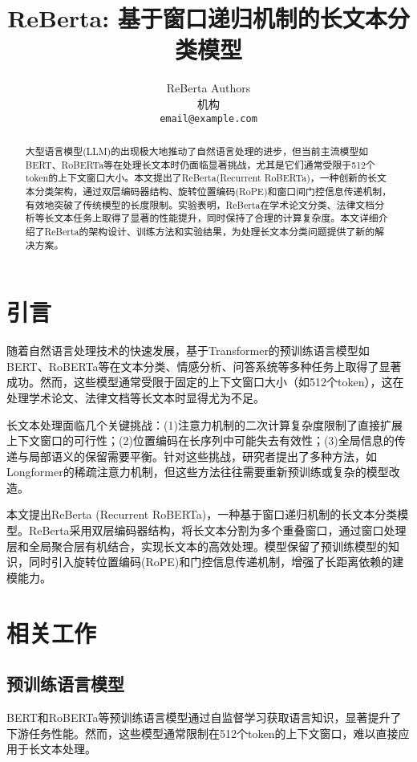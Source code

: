 \documentclass[10pt,twocolumn,letterpaper]{article}
\title{ReBerta: 基于窗口递归机制的长文本分类模型}
\author{
  ReBerta Authors\\
  机构 \\
  \texttt{email@example.com} \\
}
\begin{document}
\maketitle

\begin{abstract}
  大型语言模型(LLM)的出现极大地推动了自然语言处理的进步，但当前主流模型如BERT、RoBERTa等在处理长文本时仍面临显著挑战，尤其是它们通常受限于512个token的上下文窗口大小。本文提出了ReBerta(Recurrent RoBERTa)，一种创新的长文本分类架构，通过双层编码器结构、旋转位置编码(RoPE)和窗口间门控信息传递机制，有效地突破了传统模型的长度限制。实验表明，ReBerta在学术论文分类、法律文档分析等长文本任务上取得了显著的性能提升，同时保持了合理的计算复杂度。本文详细介绍了ReBerta的架构设计、训练方法和实验结果，为处理长文本分类问题提供了新的解决方案。
\end{abstract}

\section{引言}
随着自然语言处理技术的快速发展，基于Transformer的预训练语言模型如BERT\citep{devlin2018bert}、RoBERTa\citep{liu2019roberta}等在文本分类、情感分析、问答系统等多种任务上取得了显著成功。然而，这些模型通常受限于固定的上下文窗口大小（如512个token），这在处理学术论文、法律文档等长文本时显得尤为不足。

长文本处理面临几个关键挑战：(1)注意力机制的二次计算复杂度限制了直接扩展上下文窗口的可行性；(2)位置编码在长序列中可能失去有效性；(3)全局信息的传递与局部语义的保留需要平衡。针对这些挑战，研究者提出了多种方法，如Longformer\citep{beltagy2020longformer}的稀疏注意力机制，但这些方法往往需要重新预训练或复杂的模型改造。

本文提出ReBerta (Recurrent RoBERTa)，一种基于窗口递归机制的长文本分类模型。ReBerta采用双层编码器结构，将长文本分割为多个重叠窗口，通过窗口处理层和全局聚合层有机结合，实现长文本的高效处理。模型保留了预训练模型的知识，同时引入旋转位置编码(RoPE)\citep{su2021roformer}和门控信息传递机制，增强了长距离依赖的建模能力。

\section{相关工作}
\subsection{预训练语言模型}
BERT\citep{devlin2018bert}和RoBERTa\citep{liu2019roberta}等预训练语言模型通过自监督学习获取语言知识，显著提升了下游任务性能。然而，这些模型通常限制在512个token的上下文窗口，难以直接应用于长文本处理。
\end{document}
